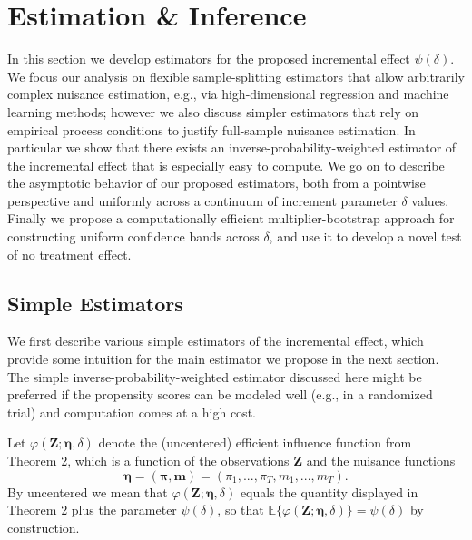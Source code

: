 \documentclass[12pt]{article}
\newcommand{\E}{\mathbb{E}}
\newcommand{\bZ}{\mathbf{Z}}
\theoremstyle{remark}
\begin{document}
\section{Estimation \& Inference}
\label{sec:estimation}

In this section we develop estimators for the proposed incremental effect $\psi(\delta)$. We focus our analysis on flexible sample-splitting estimators that allow arbitrarily complex nuisance estimation, e.g., via high-dimensional regression and machine learning methods; however we also discuss simpler estimators that rely on empirical process conditions to justify full-sample nuisance estimation. In particular we show that there exists an inverse-probability-weighted estimator of the incremental effect that is especially easy to compute. We go on to describe the asymptotic behavior of our proposed estimators, both from a pointwise perspective and uniformly across a continuum of increment parameter $\delta$ values. Finally we propose a computationally efficient multiplier-bootstrap approach for constructing uniform confidence bands across $\delta$, and use it to develop a novel test of no treatment effect.

\subsection{Simple Estimators}
\label{sec:simple}

We first describe various simple estimators of the incremental effect, which provide some intuition for the main estimator we propose in the next section. The simple inverse-probability-weighted estimator discussed here might be preferred if the propensity scores can be modeled well (e.g., in a randomized trial) and computation comes at a high cost.

Let $\varphi(\bZ; \boldsymbol\eta, \delta)$ denote the (uncentered) efficient influence function from Theorem 2, which is a function of the observations $\bZ$ and the nuisance functions
$$ \boldsymbol\eta = (\boldsymbol\pi, \textbf{m}) = (\pi_1,...,\pi_T, m_1,...,m_T) . $$
By uncentered we mean that $\varphi(\bZ;\boldsymbol\eta,\delta)$ equals the quantity displayed in Theorem 2 plus the parameter $\psi(\delta)$, so that $\E\{\varphi(\bZ;\boldsymbol\eta,\delta)\}=\psi(\delta)$ by construction.
\end{document}
